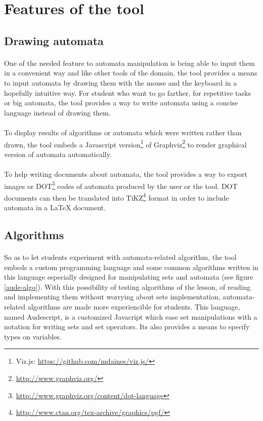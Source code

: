 \section{Features of the tool}
\subsection{Drawing automata}


\paragraph{}
One of the needed feature to automata manipulation is being able to input them in a convenient way and like other tools of the domain, the tool provides a means to input automata by drawing them with the mouse and the keyboard in a hopefully intuitive way. For student who want to go farther, for repetitive tasks or big automata, the tool provides a way to write automata using a concise language instead of drawing them.


\paragraph{}
To display results of algorithms or automata which were written rather than drawn, the tool embeds a Javascript version\footnote{Viz.js: \href{https://github.com/mdaines/viz.js/}{https://github.com/mdaines/viz.js/}} of Graphviz\footnote{\href{http://www.graphviz.org/}{http://www.graphviz.org/}} to render graphical version of automata automatically.


\paragraph{}
To help writing documents about automata, the tool provides a way to export images or DOT\footnote{\href{http://www.graphviz.org/content/dot-language}{http://www.graphviz.org/content/dot-language}} codes of automata produced by the user or the tool. DOT documents can then be translated into TiKZ\footnote{\href{http://www.ctan.org/tex-archive/graphics/pgf/}{http://www.ctan.org/tex-archive/graphics/pgf/}} format in order to include automata in a LaTeX document.


\subsection{Algorithms}


\paragraph{}
So as to let students experiment with automata-related algorithm, the tool embeds a custom programming language and some common algorithms written in this language especially designed for manipulating sets and automata (see figure \ref{aude-algo}). With this possibility of testing algorithms of the lesson, of reading and implementing them without worrying about sets implementation, automata-related algorithms are made more experiencible for students. This language, named Audescript, is a customized Javacript which ease set manipulations with a notation for writing sets and set operators. Its also provides a means to specify types on variables.


